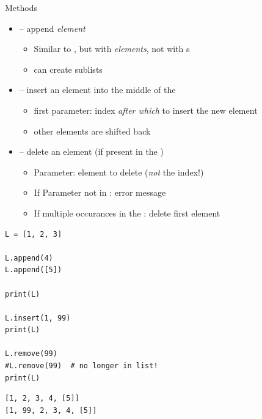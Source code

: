 
\begin{frame}[fragile]
%
\begin{minipage}{.49\linewidth}
\begin{Large}
Methods
\vspace{6pt}
\end{Large}
\begin{itemize}
\item {} -- append \emph{element}
	\begin{itemize}
	\item Similar to \inPy{+=}, but with \emph{elements}, not with s
	\item can create sublists
	\end{itemize}
\item {} -- insert an element into the middle of the 
	\begin{itemize}
	\item first parameter: index \emph{after which} to insert the new element
	\item other elements are shifted back
	\end{itemize}
\item {} -- delete an element (if present in the )
	\begin{itemize}
	\item Parameter: element to delete (\emph{not} the index!)
	\item If Parameter not in : error message
	\item If multiple occurances in the : delete first element
	\end{itemize}
\end{itemize}
\end{minipage}
%
\begin{minipage}{.49\linewidth}
\phantom{x}
\begin{codebox}
\begin{verbatim}
L = [1, 2, 3]

L.append(4)
L.append([5])

print(L)

L.insert(1, 99)
print(L)

L.remove(99)
#L.remove(99)  # no longer in list!
print(L)
\end{verbatim}
\end{codebox}
%
\begin{cmdbox}
\begin{verbatim}
[1, 2, 3, 4, [5]]
[1, 99, 2, 3, 4, [5]]
\end{verbatim}
\end{cmdbox}
\end{minipage}
%
\end{frame}

